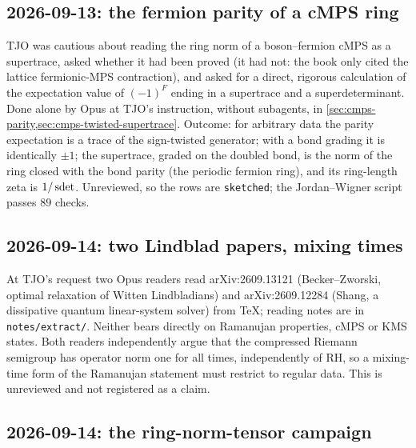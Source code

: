 \subsection*{2026-09-13: the fermion parity of a cMPS ring}

TJO was cautious about reading the ring norm of a boson--fermion cMPS as a
supertrace, asked whether it had been proved (it had not: the book only
cited the lattice fermionic-MPS contraction), and asked for a direct,
rigorous calculation of the expectation value of $(-1)^F$ ending in a
supertrace and a superdeterminant. Done alone by Opus at TJO's instruction,
without subagents, in \cref{sec:cmps-parity,sec:cmps-twisted-supertrace}.
Outcome: for arbitrary data the parity expectation is a trace of the
sign-twisted generator; with a bond grading it is identically $\pm1$; the
supertrace, graded on the doubled bond, is the norm of the ring closed
with the bond parity (the periodic fermion ring), and its ring-length
zeta is $1/\operatorname{sdet}$. Unreviewed, so the rows are \texttt{sketched}; the
Jordan--Wigner script passes $89$ checks.

\subsection*{2026-09-14: two Lindblad papers, mixing times}

At TJO's request two Opus readers read arXiv:2609.13121 (Becker--Zworski,
optimal relaxation of Witten Lindbladians) and arXiv:2609.12284 (Shang,
a dissipative quantum linear-system solver) from TeX; reading notes are in
\texttt{notes/extract/}. Neither bears directly on Ramanujan properties,
cMPS or KMS states. Both readers independently argue that the compressed
Riemann semigroup has operator norm one for all times, independently of
RH, so a mixing-time form of the Ramanujan statement must restrict to
regular data. This is unreviewed and not registered as a claim.

\subsection*{2026-09-14: the ring-norm-tensor campaign}

